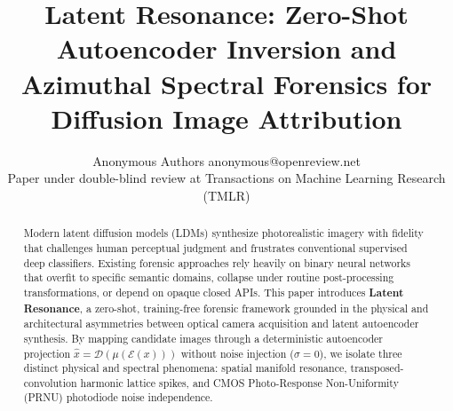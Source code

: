 \documentclass[11pt]{article}
\title{Latent Resonance: Zero-Shot Autoencoder Inversion and Azimuthal Spectral Forensics for Diffusion Image Attribution}
\author{\name Anonymous Authors \email anonymous@openreview.net \\
      \addr Paper under double-blind review at Transactions on Machine Learning Research (TMLR)}
\theoremstyle{definition}
\begin{document}
\maketitle

\begin{abstract}
Modern latent diffusion models (LDMs) synthesize photorealistic imagery with fidelity that challenges human perceptual judgment and frustrates conventional supervised deep classifiers. Existing forensic approaches rely heavily on binary neural networks that overfit to specific semantic domains, collapse under routine post-processing transformations, or depend on opaque closed APIs. This paper introduces \textbf{Latent Resonance}, a zero-shot, training-free forensic framework grounded in the physical and architectural asymmetries between optical camera acquisition and latent autoencoder synthesis. By mapping candidate images through a deterministic autoencoder projection $\hat{x} = \mathcal{D}(\mu(\mathcal{E}(x)))$ without noise injection ($\sigma = 0$), we isolate three distinct physical and spectral phenomena: spatial manifold resonance, transposed-convolution harmonic lattice spikes, and CMOS Photo-Response Non-Uniformity (PRNU) photodiode noise independence.


\end{abstract}
\end{document}
